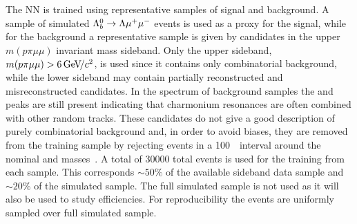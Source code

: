 The NN is trained using representative samples of signal and background.  A sample of simulated 
${{\Lambda}^0_{b}}\rightarrow{\ensuremath{\Lambda}}{\ensuremath{\mu^+\mu^-}}$ events is used as a proxy for the signal, while for the background a representative sample
is given by candidates in the upper $m(p\pi\mu\mu)$ invariant mass sideband. Only the upper sideband,
$m(p\pi\mu\mu) > 6 \gevcc$, is used since it contains only combinatorial background,
while the lower sideband may contain partially reconstructed and misreconstructed candidates.
In the \qsq spectrum of background samples the \jpsi and \psitwos peaks are still present indicating that charmonium
resonances are often combined with other random tracks. These candidates do not give a good description of purely
combinatorial background and, in order to avoid biases, they are removed from the training
sample by rejecting events in a 100~\mevcc~interval around the nominal \jpsi and \psitwos masses~\cite{PDG2014}.
A total of 30000 total events is used for the training from each sample. This corresponds $\sim 50\%$ of the available
sideband data sample and $\sim 20\%$ of the simulated sample. The full simulated sample is not used
as it will also be used to study efficiencies. For reproducibility the events are uniformly sampled over full simulated sample.

